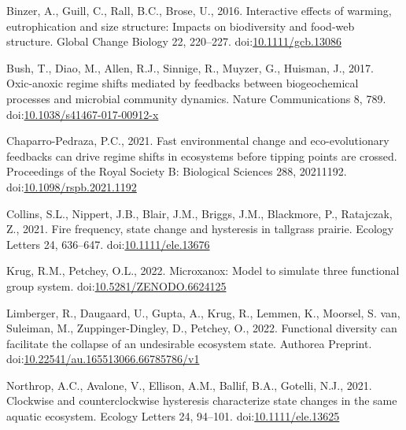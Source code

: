 \documentclass[
]{article}
\newlength{\cslhangindent}
\newlength{\cslentryspacingunit} %
\newenvironment{CSLReferences}[2] %
 {%
  \setlength{\parindent}{0pt}
  \ifodd #1
  \let\oldpar\par
  \def\par{\hangindent=\cslhangindent\oldpar}
  \fi
  \setlength{\parskip}{#2\cslentryspacingunit}
 }%
 {}
\begin{document}
\hypertarget{refs}{}
\begin{CSLReferences}{1}{0}
\leavevmode{}%
Binzer, A., Guill, C., Rall, B.C., Brose, U., 2016. Interactive effects
of warming, eutrophication and size structure: Impacts on biodiversity
and food-web structure. Global Change Biology 22, 220--227.
doi:\href{https://doi.org/10.1111/gcb.13086}{10.1111/gcb.13086}

\leavevmode{}%
Bush, T., Diao, M., Allen, R.J., Sinnige, R., Muyzer, G., Huisman, J.,
2017. Oxic-anoxic regime shifts mediated by feedbacks between
biogeochemical processes and microbial community dynamics. Nature
Communications 8, 789.
doi:\href{https://doi.org/10.1038/s41467-017-00912-x}{10.1038/s41467-017-00912-x}

\leavevmode{}%
Chaparro-Pedraza, P.C., 2021. Fast environmental change and
eco-evolutionary feedbacks can drive regime shifts in ecosystems before
tipping points are crossed. Proceedings of the Royal Society B:
Biological Sciences 288, 20211192.
doi:\href{https://doi.org/10.1098/rspb.2021.1192}{10.1098/rspb.2021.1192}

\leavevmode{}%
Collins, S.L., Nippert, J.B., Blair, J.M., Briggs, J.M., Blackmore, P.,
Ratajczak, Z., 2021. Fire frequency, state change and hysteresis in
tallgrass prairie. Ecology Letters 24, 636--647.
doi:\href{https://doi.org/10.1111/ele.13676}{10.1111/ele.13676}

\leavevmode{}%
Krug, R.M., Petchey, O.L., 2022. Microxanox: {Model} to simulate three
functional group system.
doi:\href{https://doi.org/10.5281/ZENODO.6624125}{10.5281/ZENODO.6624125}

\leavevmode{}%
Limberger, R., Daugaard, U., Gupta, A., Krug, R., Lemmen, K., Moorsel,
S. van, Suleiman, M., Zuppinger-Dingley, D., Petchey, O., 2022.
Functional diversity can facilitate the collapse of an undesirable
ecosystem state. Authorea Preprint.
doi:\href{https://doi.org/10.22541/au.165513066.66785786/v1}{10.22541/au.165513066.66785786/v1}

\leavevmode{}%
Northrop, A.C., Avalone, V., Ellison, A.M., Ballif, B.A., Gotelli, N.J.,
2021. Clockwise and counterclockwise hysteresis characterize state
changes in the same aquatic ecosystem. Ecology Letters 24, 94--101.
doi:\href{https://doi.org/10.1111/ele.13625}{10.1111/ele.13625}


\end{CSLReferences}
\end{document}
